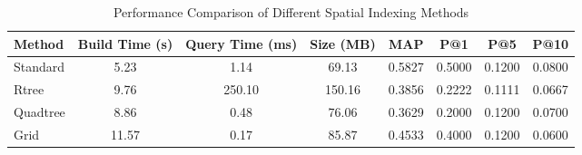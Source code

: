 \begin{table}[htbp]
    \centering
    \caption{Performance Comparison of Different Spatial Indexing Methods}
    \begin{tabular}{|l|c|c|c|c|c|c|c|}
\hline
    \textbf{Method} & \textbf{Build Time (s)} & \textbf{Query Time (ms)} & \textbf{Size (MB)} & 
    \textbf{MAP} & \textbf{P@1} & \textbf{P@5} & \textbf{P@10} \\
\hline
    Standard & 5.23 & 1.14 & 69.13 & 0.5827 & 0.5000 & 0.1200 & 0.0800 \\
    Rtree & 9.76 & 250.10 & 150.16 & 0.3856 & 0.2222 & 0.1111 & 0.0667 \\
    Quadtree & 8.86 & 0.48 & 76.06 & 0.3629 & 0.2000 & 0.1200 & 0.0700 \\
    Grid & 11.57 & 0.17 & 85.87 & 0.4533 & 0.4000 & 0.1200 & 0.0600 \\
\hline
    \end{tabular}
    \label{tab:spatial-index-comparison}
\end{table}